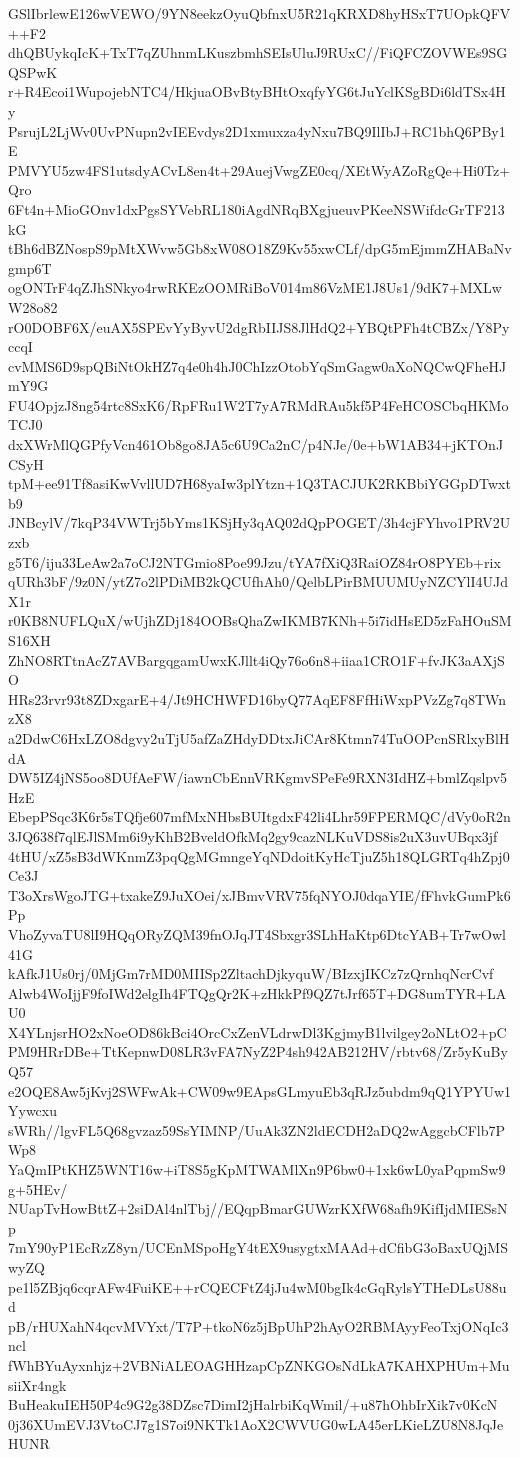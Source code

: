 GSlIbrlewE126wVEWO/9YN8eekzOyuQbfnxU5R21qKRXD8hyHSxT7UOpkQFV++F2
dhQBUykqIcK+TxT7qZUhnmLKuszbmhSEIsUluJ9RUxC//FiQFCZOVWEs9SGQSPwK
r+R4Ecoi1WupojebNTC4/HkjuaOBvBtyBHtOxqfyYG6tJuYclKSgBDi6ldTSx4Hy
PsrujL2LjWv0UvPNupn2vIEEvdys2D1xmuxza4yNxu7BQ9IlIbJ+RC1bhQ6PBy1E
PMVYU5zw4FS1utsdyACvL8en4t+29AuejVwgZE0cq/XEtWyAZoRgQe+Hi0Tz+Qro
6Ft4n+MioGOnv1dxPgsSYVebRL180iAgdNRqBXgjueuvPKeeNSWifdcGrTF213kG
tBh6dBZNospS9pMtXWvw5Gb8xW08O18Z9Kv55xwCLf/dpG5mEjmmZHABaNvgmp6T
ogONTrF4qZJhSNkyo4rwRKEzOOMRiBoV014m86VzME1J8Us1/9dK7+MXLwW28o82
rO0DOBF6X/euAX5SPEvYyByvU2dgRbIIJS8JlHdQ2+YBQtPFh4tCBZx/Y8PyccqI
cvMMS6D9spQBiNtOkHZ7q4e0h4hJ0ChIzzOtobYqSmGagw0aXoNQCwQFheHJmY9G
FU4OpjzJ8ng54rtc8SxK6/RpFRu1W2T7yA7RMdRAu5kf5P4FeHCOSCbqHKMoTCJ0
dxXWrMlQGPfyVcn461Ob8go8JA5c6U9Ca2nC/p4NJe/0e+bW1AB34+jKTOnJCSyH
tpM+ee91Tf8asiKwVvllUD7H68yaIw3plYtzn+1Q3TACJUK2RKBbiYGGpDTwxtb9
JNBcylV/7kqP34VWTrj5bYms1KSjHy3qAQ02dQpPOGET/3h4cjFYhvo1PRV2Uzxb
g5T6/iju33LeAw2a7oCJ2NTGmio8Poe99Jzu/tYA7fXiQ3RaiOZ84rO8PYEb+rix
qURh3bF/9z0N/ytZ7o2lPDiMB2kQCUfhAh0/QelbLPirBMUUMUyNZCYlI4UJdX1r
r0KB8NUFLQuX/wUjhZDj184OOBsQhaZwIKMB7KNh+5i7idHsED5zFaHOuSMS16XH
ZhNO8RTtnAcZ7AVBargqgamUwxKJllt4iQy76o6n8+iiaa1CRO1F+fvJK3aAXjSO
HRs23rvr93t8ZDxgarE+4/Jt9HCHWFD16byQ77AqEF8FfHiWxpPVzZg7q8TWnzX8
a2DdwC6HxLZO8dgvy2uTjU5afZaZHdyDDtxJiCAr8Ktmn74TuOOPcnSRlxyBlHdA
DW5IZ4jNS5oo8DUfAeFW/iawnCbEnnVRKgmvSPeFe9RXN3IdHZ+bmlZqslpv5HzE
EbepPSqc3K6r5sTQfje607mfMxNHbsBUItgdxF42li4Lhr59FPERMQC/dVy0oR2n
3JQ638f7qlEJlSMm6i9yKhB2BveldOfkMq2gy9cazNLKuVDS8is2uX3uvUBqx3jf
4tHU/xZ5sB3dWKnmZ3pqQgMGmngeYqNDdoitKyHcTjuZ5h18QLGRTq4hZpj0Ce3J
T3oXrsWgoJTG+txakeZ9JuXOei/xJBmvVRV75fqNYOJ0dqaYIE/fFhvkGumPk6Pp
VhoZyvaTU8lI9HQqORyZQM39fnOJqJT4Sbxgr3SLhHaKtp6DtcYAB+Tr7wOwl41G
kAfkJ1Us0rj/0MjGm7rMD0MIISp2ZltachDjkyquW/BIzxjIKCz7zQrnhqNcrCvf
Alwb4WoIjjF9foIWd2elgIh4FTQgQr2K+zHkkPf9QZ7tJrf65T+DG8umTYR+LAU0
X4YLnjsrHO2xNoeOD86kBci4OrcCxZenVLdrwDl3KgjmyB1lvilgey2oNLtO2+pC
PM9HRrDBe+TtKepnwD08LR3vFA7NyZ2P4sh942AB212HV/rbtv68/Zr5yKuByQ57
e2OQE8Aw5jKvj2SWFwAk+CW09w9EApsGLmyuEb3qRJz5ubdm9qQ1YPYUw1Yywcxu
sWRh//lgvFL5Q68gvzaz59SsYIMNP/UuAk3ZN2ldECDH2aDQ2wAggcbCFlb7PWp8
YaQmIPtKHZ5WNT16w+iT8S5gKpMTWAMlXn9P6bw0+1xk6wL0yaPqpmSw9g+5HEv/
NUapTvHowBttZ+2siDAl4nlTbj//EQqpBmarGUWzrKXfW68afh9KifIjdMIESsNp
7mY90yP1EcRzZ8yn/UCEnMSpoHgY4tEX9usygtxMAAd+dCfibG3oBaxUQjMSwyZQ
pe1l5ZBjq6cqrAFw4FuiKE++rCQECFtZ4jJu4wM0bgIk4cGqRylsYTHeDLsU88ud
pB/rHUXahN4qcvMVYxt/T7P+tkoN6z5jBpUhP2hAyO2RBMAyyFeoTxjONqIc3ncl
fWhBYuAyxnhjz+2VBNiALEOAGHHzapCpZNKGOsNdLkA7KAHXPHUm+MusiiXr4ngk
BuHeakuIEH50P4c9G2g38DZsc7DimI2jHalrbiKqWmil/+u87hOhbIrXik7v0KcN
0j36XUmEVJ3VtoCJ7g1S7oi9NKTk1AoX2CWVUG0wLA45erLKieLZU8N8JqJeHUNR
